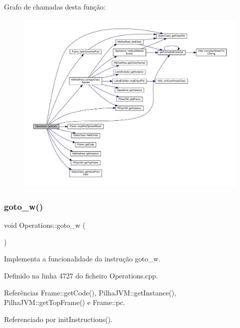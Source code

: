 Grafo de chamadas desta função\+:
\nopagebreak
\begin{figure}[H]
\begin{center}
\leavevmode
\includegraphics[width=350pt]{classOperations_a0514422a81aa3efa5cb8b3bd1a505a68_cgraph}
\end{center}
\end{figure}
\mbox{\label{classOperations_aed8436ead5dfcaef69b24e1b2fff7744}} 
\subsubsection{\texorpdfstring{goto\+\_\+w()}{goto\_w()}}
{\footnotesize\ttfamily void Operations\+::goto\+\_\+w (\begin{DoxyParamCaption}{ }\end{DoxyParamCaption})\hspace{0.3cm}{\ttfamily [private]}}



Implementa a funcionalidade da instrução goto\+\_\+w. 



Definido na linha 4727 do ficheiro Operations.\+cpp.



Referências Frame\+::get\+Code(), Pilha\+J\+V\+M\+::get\+Instance(), Pilha\+J\+V\+M\+::get\+Top\+Frame() e Frame\+::pc.



Referenciado por init\+Instructions().

